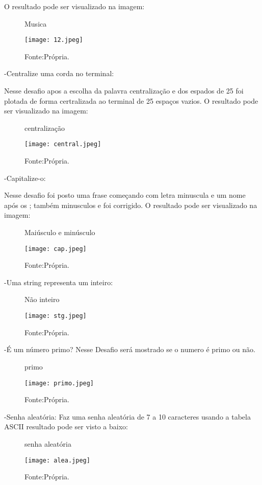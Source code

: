 O resultado pode ser visualizado na imagem:
\begin{figure} [h!]	
    \centering
    \caption{Musica}
    \texttt{[image: 12.jpeg]}
    \caption*{Fonte:Própria.}
    \label{fig:musica}
\end{figure}

-Centralize uma corda no terminal:

Nesse desafio apos a escolha da palavra centralização e dos espados de 25 foi plotada de forma certralizada ao terminal de 25 espaços vazios.
O resultado pode ser visualizado na imagem:
\begin{figure} [h!]	
    \centering
    \caption{centralização}
    \texttt{[image: central.jpeg]}
    \caption*{Fonte:Própria.}
    \label{fig:centralizar}
\end{figure}

-Capitalize-o:

Nesse desafio foi posto uma frase começando com letra minuscula e um nome após os ; também minusculos e foi corrigido.
O resultado pode ser visualizado na imagem:
\begin{figure} [h!]	
    \centering
    \caption{Maiúsculo e minúsculo}
    \texttt{[image: cap.jpeg]}
    \caption*{Fonte:Própria.}
    \label{fig:cap}
\end{figure}

-Uma string representa um inteiro:

\begin{figure} [h!]	
    \centering
    \caption{Não inteiro}
    \texttt{[image: stg.jpeg]}
    \caption*{Fonte:Própria.}
    \label{fig:stg}
\end{figure}

-É um número primo?
Nesse Desafio será mostrado se o numero é primo ou não.

\begin{figure} [h!]	
    \centering
    \caption{primo}
    \texttt{[image: primo.jpeg]}
    \caption*{Fonte:Própria.}
    \label{fig:primo}
\end{figure}

-Senha aleatória:
Faz uma senha aleatória de 7 a 10 caracteres usando a tabela ASCII
resultado pode ser visto a baixo:
\begin{figure} [h!]	
    \centering
    \caption{senha aleatória}
    \texttt{[image: alea.jpeg]}
    \caption*{Fonte:Própria.}
    \label{fig:senhaaleatoria}
\end{figure}


